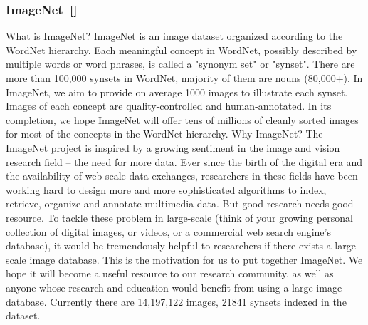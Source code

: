 \subsubsection{ImageNet~[\cite{deng_imagenet:_2009}]}
 What is ImageNet?
ImageNet is an image dataset organized according to the WordNet hierarchy. Each meaningful concept in WordNet, possibly described by multiple words or word phrases, is called a "synonym set" or "synset". There are more than 100,000 synsets in WordNet, majority of them are nouns (80,000+). In ImageNet, we aim to provide on average 1000 images to illustrate each synset. Images of each concept are quality-controlled and human-annotated. In its completion, we hope ImageNet will offer tens of millions of cleanly sorted images for most of the concepts in the WordNet hierarchy.
Why ImageNet?
The ImageNet project is inspired by a growing sentiment in the image and vision research field – the need for more data. Ever since the birth of the digital era and the availability of web-scale data exchanges, researchers in these fields have been working hard to design more and more sophisticated algorithms to index, retrieve, organize and annotate multimedia data. But good research needs good resource. To tackle these problem in large-scale (think of your growing personal collection of digital images, or videos, or a commercial web search engine’s database), it would be tremendously helpful to researchers if there exists a large-scale image database. This is the motivation for us to put together ImageNet. We hope it will become a useful resource to our research community, as well as anyone whose research and education would benefit from using a large image database. 
Currently there are 14,197,122 images, 21841 synsets indexed in the dataset. 

